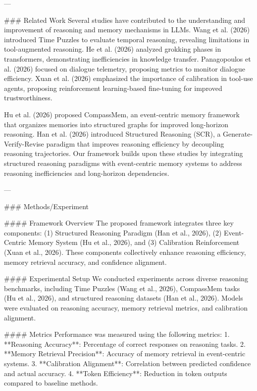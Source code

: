 ---

### Related Work  
Several studies have contributed to the understanding and improvement of reasoning and memory mechanisms in LLMs. Wang et al. (2026) introduced Time Puzzles to evaluate temporal reasoning, revealing limitations in tool-augmented reasoning. He et al. (2026) analyzed grokking phases in transformers, demonstrating inefficiencies in knowledge transfer. Panagopoulos et al. (2026) focused on dialogue telemetry, proposing metrics to monitor dialogue efficiency. Xuan et al. (2026) emphasized the importance of calibration in tool-use agents, proposing reinforcement learning-based fine-tuning for improved trustworthiness.

Hu et al. (2026) proposed CompassMem, an event-centric memory framework that organizes memories into structured graphs for improved long-horizon reasoning. Han et al. (2026) introduced Structured Reasoning (SCR), a Generate-Verify-Revise paradigm that improves reasoning efficiency by decoupling reasoning trajectories. Our framework builds upon these studies by integrating structured reasoning paradigms with event-centric memory systems to address reasoning inefficiencies and long-horizon dependencies.

---

### Methods/Experiment  

#### Framework Overview  
The proposed framework integrates three key components: (1) Structured Reasoning Paradigm (Han et al., 2026), (2) Event-Centric Memory System (Hu et al., 2026), and (3) Calibration Reinforcement (Xuan et al., 2026). These components collectively enhance reasoning efficiency, memory retrieval accuracy, and confidence alignment.

#### Experimental Setup  
We conducted experiments across diverse reasoning benchmarks, including Time Puzzles (Wang et al., 2026), CompassMem tasks (Hu et al., 2026), and structured reasoning datasets (Han et al., 2026). Models were evaluated on reasoning accuracy, memory retrieval metrics, and calibration alignment.

#### Metrics  
Performance was measured using the following metrics:  
1. **Reasoning Accuracy**: Percentage of correct responses on reasoning tasks.  
2. **Memory Retrieval Precision**: Accuracy of memory retrieval in event-centric systems.  
3. **Calibration Alignment**: Correlation between predicted confidence and actual accuracy.  
4. **Token Efficiency**: Reduction in token outputs compared to baseline methods.

